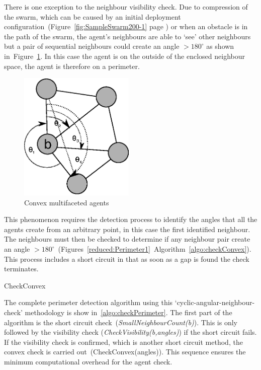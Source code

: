 There is one exception to the neighbour visibility check. Due to compression of the swarm, which can be caused by an initial deployment configuration~(Figure~\ref{fig:SampleSwarm200-1} page \pageref{fig:SampleSwarm200-1}) or when an obstacle is in the path of the swarm, the agent's neighbours are able to `see' other neighbours but a pair of sequential neighbours could create an angle $> 180^\circ$ as shown in~Figure~\ref{reduced:Perimeter2}. In this case the agent is on the outside of the enclosed neighbour space, the agent is therefore on a perimeter. 

\begin{figure}[H]
\begin{center}
\includegraphics[width=5.5cm]{CHAPTER-6/figures/Perimeter2}
\end{center}
\caption{Convex multifaceted agents \label{reduced:Perimeter2}}
\end{figure}

This phenomenon requires the detection process to identify the angles that all the agents create from an arbitrary point, in this case the first identified neighbour. The neighbours must then be checked to determine if any neighbour pair create an angle $> 180^\circ$~(Figures~\ref{reduced:Perimeter1}~Algorithm~\ref{algo:checkConvex}). This process includes a short circuit in that as soon as a gap is found the check terminates. 

\begin{algorithm}[H]
\DontPrintSemicolon
\SetAlgoLined
\caption{CheckConvex}
\label{algo:checkConvex}
\end{algorithm}

The complete perimeter detection algorithm using this `cyclic-angular-neighbour-check' methodology is show in~\autoref{algo:checkPerimeter}. The first part of the algorithm is the short circuit check~(\textit{SmallNeighbourCount(b)}). This is only followed by the visibility check (\textit{CheckVisibility(b,angles)}) if the short circuit fails. If the visibility check is confirmed, which is another short circuit method, the convex check is carried out~(CheckConvex(angles)). This sequence ensures the minimum computational overhead for the agent check. 

